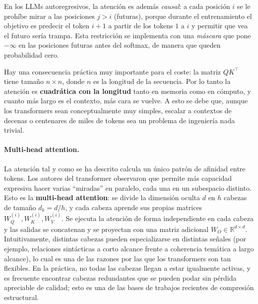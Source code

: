 \documentclass[11pt,a4paper]{article}
\begin{document}
En los LLMs autoregresivos, la atención es además \emph{causal}: a cada posición $i$ se le prohíbe mirar a las posiciones $j > i$ (futuras), porque durante el entrenamiento el objetivo es predecir el token $i+1$ a partir de los tokens $1$ a $i$ y permitir que vea el futuro sería trampa. Esta restricción se implementa con una \textit{máscara} que pone $-\infty$ en las posiciones futuras antes del softmax, de manera que queden probabilidad cero.

Hay una consecuencia práctica muy importante para el coste: la matriz $Q K^\top$ tiene tamaño $n \times n$, donde $n$ es la longitud de la secuencia. Por lo tanto la atención es \textbf{cuadrática con la longitud} tanto en memoria como en cómputo, y cuanto más largo es el contexto, más cara se vuelve. A esto se debe que, aunque los transformers sean conceptualmente muy simples, escalar a contextos de decenas o centenares de miles de tokens sea un problema de ingeniería nada trivial.

\paragraph{Multi-head attention.} La atención tal y como se ha descrito calcula un único patrón de afinidad entre tokens. Los autores del transformer observaron que permite más capacidad expresiva hacer varias ``miradas'' en paralelo, cada una en un subespacio distinto. Esto es la \textbf{multi-head attention}: se divide la dimensión oculta $d$ en $h$ cabezas de tamaño $d_k = d/h$, y cada cabeza aprende sus propias matrices $W_Q^{(i)}, W_K^{(i)}, W_V^{(i)}$. Se ejecuta la atención de forma independiente en cada cabeza y las salidas se concatenan y se proyectan con una matriz adicional $W_O \in \mathbb{R}^{d\times d}$. Intuitivamente, distintas cabezas pueden especializarse en distintas señales (por ejemplo, relaciones sintácticas a corto alcance frente a coherencia temática a largo alcance), lo cual es una de las razones por las que los transformers son tan flexibles. En la práctica, no todas las cabezas llegan a estar igualmente activas, y es frecuente encontrar cabezas redundantes que se pueden podar sin pérdida apreciable de calidad; esto es una de las bases de trabajos recientes de compresión estructural.
\end{document}
